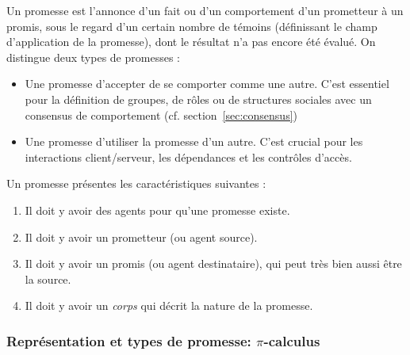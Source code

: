 Un promesse est l'annonce d'un fait ou d'un comportement d'un prometteur à un
promis, sous le regard d'un certain nombre de témoins (définissant le champ
d'application de la promesse), dont le résultat n'a pas encore été évalué.  On
distingue deux types de promesses :

\begin{itemize}
    \item Une promesse d'accepter de se comporter comme une autre. C'est
        essentiel pour la définition de groupes, de rôles ou de structures
        sociales avec un consensus de comportement (cf.
        section~\ref{sec:consensus})
    \item Une promesse d'utiliser la promesse d'un autre. C'est crucial pour les
        interactions client/serveur, les dépendances et les contrôles d'accès.
\end{itemize}

Un promesse présentes les caractéristiques suivantes :

\begin{enumerate}
    \item Il doit y avoir des agents pour qu'une promesse existe.
    \item Il doit y avoir un prometteur (ou agent source).
    \item Il doit y avoir un promis (ou agent destinataire), qui peut très bien
        aussi être la source.
    \item Il doit y avoir un \emph{corps} qui décrit la nature de la promesse.
\end{enumerate}

\subsubsection{Représentation et types de promesse: $\pi$-calculus}

